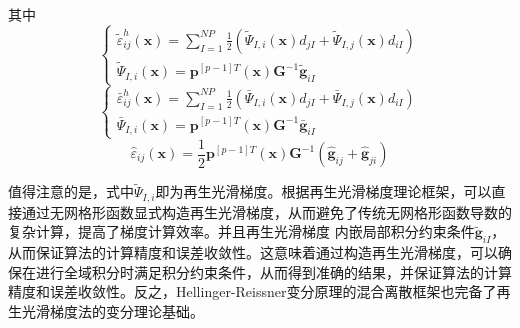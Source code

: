 其中
\begin{equation}
\begin{cases}\label{case1}
    \tilde{\varepsilon}^h_{ij}(\pmb{x})=\displaystyle\sum_{I=1}^{N\!P}\frac{1}{2}(\tilde{\Psi}_{I,i}(\pmb{x})d_{jI}+\tilde{\Psi}_{I,j}(\pmb{x})d_{iI})\\
    \tilde{\Psi}_{I,i}(\pmb{x})=\pmb{p}^{[p-1]T}(\pmb{x})\pmb{G}^{-1}\tilde{\pmb g}_{iI}
\end{cases}
\end{equation}
\begin{equation}
\begin{cases}\label{case2}
    \bar{\varepsilon}^h_{ij}(\pmb{x})=\displaystyle\sum_{I=1}^{N\!P}\frac{1}{2}(\bar{\Psi}_{I,i}(\pmb{x})d_{jI}+\bar{\Psi}_{I,j}(\pmb{x})d_{iI})\\
    \bar{\Psi}_{I,i}(\pmb{x})=\pmb{p}^{[p-1]T}(\pmb{x})\pmb{G}^{-1}\bar{\pmb g}_{iI}
\end{cases}
\end{equation}
\begin{equation}\label{case3}
    \hat{\varepsilon}_{ij}(\pmb{x})=\frac{1}{2}\pmb{p}^{[p-1]T}(\pmb{x})\pmb{G}^{-1}(\hat{\pmb g}_{ij}+\hat{\pmb g}_{ji})
\end{equation} \par
值得注意的是，式中$\tilde{\Psi}_{I,i}$即为再生光滑梯度\cite{wang2019}。根据再生光滑梯度理论框架，可以直接通过无网格形函数显式构造再生光滑梯度，从而避免了传统无网格形函数导数的复杂计算，提高了梯度计算效率。并且再生光滑梯度
内嵌局部积分约束条件$\tilde{\pmb g}_{iI}$，从而保证算法的计算精度和误差收敛性。这意味着通过构造再生光滑梯度，可以确保在进行全域积分时满足积分约束条件，从而得到准确的结果，并保证算法的计算精度和误差收敛性。反之，Hellinger-Reissner变分原理的混合离散框架也完备了再生光滑梯度法的变分理论基础。\par
